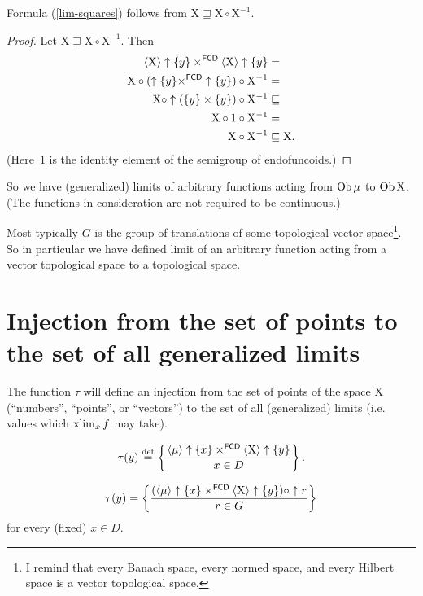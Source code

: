 \begin{prop}
Formula (\ref{lim-squares}) follows from $\mathrm{X}\sqsupseteq\mathrm{X}\circ\mathrm{X}^{-1}$.
\end{prop}

\begin{proof}
Let $\mathrm{X}\sqsupseteq\mathrm{X}\circ\mathrm{X}^{-1}$. Then
\begin{align*}
\left\langle \mathrm{X}\right\rangle\uparrow\{y\}\times^{\mathsf{FCD}}\left\langle \mathrm{X}\right\rangle\uparrow\{y\} & =\\
\mathrm{X}\circ(\uparrow\{y\}\times^{\mathsf{FCD}}\uparrow\{y\})\circ\mathrm{X}^{-1} & =\\
\mathrm{X}\circ\uparrow(\{y\}\times\{y\})\circ\mathrm{X}^{-1} & \sqsubseteq\\
\mathrm{X}\circ 1\circ\mathrm{X}^{-1} & =\\
\mathrm{X}\circ\mathrm{X}^{-1} & \sqsubseteq\mathrm{X}.
\end{align*}
(Here~$1$ is the identity element of the semigroup of endofuncoids.)
\end{proof}

So we have (generalized) limits of arbitrary functions
acting from $\operatorname{Ob}\mu$ to $\operatorname{Ob}\mathrm{X}$. (The functions in consideration
are not required to be continuous.)

\begin{rem}
Most typically $G$ is the group of translations of some topological vector space\footnote{I remind that every Banach space, every normed space, and every Hilbert space is a vector topological space.}. So in particular we have defined limit of an arbitrary function acting from a vector topological space to a topological space.
\end{rem}

\section[Injection to generalized limits]{Injection from the set of points to the set of all generalized limits}

The function $\tau$ will define an injection from the set of points
of the space $\mathrm{X}$ (``numbers'', ``points'', or ``vectors'')
to the set of all (generalized) limits (i.e. values which $\operatorname{xlim}_{x}f$
may take).
\begin{defn}
\[ \tau(y)\overset{\mathrm{def}}{=}\left\{ \frac{\left\langle \mu\right\rangle\uparrow\{x\}\times^{\mathsf{FCD}}\left\langle \mathrm{X}\right\rangle\uparrow\{y\}}{x\in D}\right\}. \]
\end{defn}
\begin{prop}
\[ \tau(y)=\left\{ \frac{(\left\langle \mu\right\rangle\uparrow\{x\}\times^{\mathsf{FCD}}\left\langle \mathrm{X}\right\rangle\uparrow\{y\})\circ\uparrow r}{r\in G}\right\} \]
for every (fixed) $x\in D$.\end{prop}

